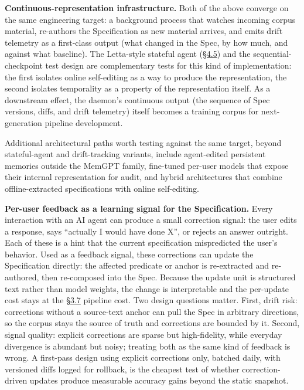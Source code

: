 \textbf{Continuous-representation infrastructure.} Both of the above
converge on the same engineering target: a background process that
watches incoming corpus material, re-authors the Specification as new
material arrives, and emits drift telemetry as a first-class output
(what changed in the Spec, by how much, and against what baseline). The
Letta-style stateful agent (\hyperref[exploratory-case-study-letta-stateful-agent-n3-post-hoc]{§4.5}) and the sequential-checkpoint test
design are complementary tests for this kind of implementation: the
first isolates online self-editing as a way to produce the
representation, the second isolates temporality as a property of the
representation itself. As a downstream effect, the daemon's continuous
output (the sequence of Spec versions, diffs, and drift telemetry)
itself becomes a training corpus for next-generation pipeline
development.

Additional architectural paths worth testing against the same target,
beyond stateful-agent and drift-tracking variants, include agent-edited
persistent memories outside the MemGPT family, fine-tuned per-user
models that expose their internal representation for audit, and hybrid
architectures that combine offline-extracted specifications with online
self-editing.

\textbf{Per-user feedback as a learning signal for the Specification.}
Every interaction with an AI agent can produce a small correction
signal: the user edits a response, says ``actually I would have done
X'', or rejects an answer outright. Each of these is a hint that the
current specification mispredicted the user's behavior. Used as a
feedback signal, these corrections can update the Specification
directly: the affected predicate or anchor is re-extracted and
re-authored, then re-composed into the Spec. Because the update unit is
structured text rather than model weights, the change is interpretable
and the per-update cost stays at the \hyperref[pipeline-for-the-behavioral-specification]{§3.7} pipeline cost. Two design
questions matter. First, drift risk: corrections without a source-text
anchor can pull the Spec in arbitrary directions, so the corpus stays
the source of truth and corrections are bounded by it. Second, signal
quality: explicit corrections are sparse but high-fidelity, while
everyday divergence is abundant but noisy; treating both as the same
kind of feedback is wrong. A first-pass design using explicit
corrections only, batched daily, with versioned diffs logged for
rollback, is the cheapest test of whether correction-driven updates
produce measurable accuracy gains beyond the static snapshot.

